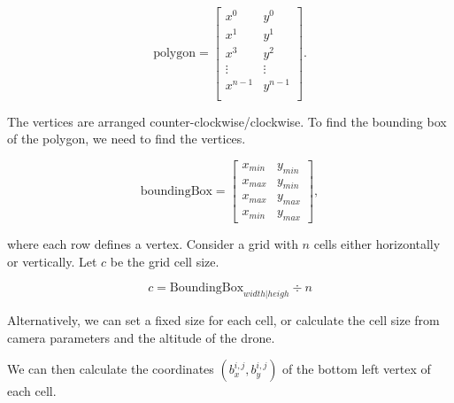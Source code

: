 \begin{figure}
	
	\label{fig:viewpoint-generation}
\end{figure}

$$
\text{polygon} = \begin{bmatrix}
x^0 & y^0 \\
x^1 & y^1 \\
x^3 & y^2 \\
\vdots  & \vdots \\
x^{n-1} & y^{n-1} \\
\end{bmatrix}. 
$$

The vertices are arranged counter-clockwise/clockwise. To find the bounding box of the polygon, we need to find the vertices.

$$
\text{boundingBox} = \begin{bmatrix}
x_{min} & y_{min} \\
x_{max} & y_{min} \\
x_{max} & y_{max} \\
x_{min} & y_{max}
\end{bmatrix},
$$



where each row defines a vertex. Consider a grid with $n$ cells either horizontally or vertically. Let $c$ be the grid cell size.

$$c = \text{BoundingBox}_{width|heigh} \div  n $$

Alternatively, we can set a fixed size for each cell, or calculate the cell size from camera parameters and the altitude of the drone.

We can then calculate the coordinates $(b^{i,j}_x, b^{i,j}_y)$ of the bottom left vertex of each cell.

